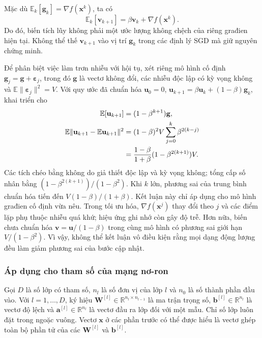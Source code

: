 Mặc dù $\mathbb{E}_k[\mathbf{g}_k]=\nabla f(\mathbf{x}^{k})$, ta có
\begin{equation}
 \mathbb{E}_k[\mathbf{v}_{k+1}]=\beta\mathbf{v}_k+
                                  \nabla f(\mathbf{x}^{k}).
 \label{eq:mom-conditional-mean}
\end{equation}
Do đó, biến tích lũy không phải một ước lượng không chệch của riêng
građien hiện tại. Không thể thế $\mathbf{v}_{k+1}$ vào vị trí
$\mathbf{g}_k$ trong các định lý SGD mà giữ nguyên chứng minh.

Để phân biệt việc làm trơn nhiễu với hội tụ, xét riêng mô hình cố định
$\mathbf{g}_j=\mathbf{g}+\boldsymbol{\varepsilon}_j$, trong đó
$\mathbf{g}$ là vectơ không đổi, các nhiễu độc lập có kỳ vọng không và
$\mathbb{E}\|\boldsymbol{\varepsilon}_j\|^2=V$.
Với quy ước đã chuẩn hóa $\mathbf{u}_0=0$,
$\mathbf{u}_{k+1}=\beta\mathbf{u}_k+(1-\beta)\mathbf{g}_k$, khai triển cho
\begin{align}
 \mathbb{E}[\mathbf{u}_{k+1}]&=(1-\beta^{k+1})\mathbf{g},\notag\\
 \mathbb{E}\|\mathbf{u}_{k+1}-\mathbb{E}\mathbf{u}_{k+1}\|^2
 &=(1-\beta)^2V\sum_{j=0}^{k}\beta^{2(k-j)}\notag\\
 &=\frac{1-\beta}{1+\beta}
             (1-\beta^{2(k+1)})V.
 \label{eq:mom-noise-smoothing}
\end{align}
Các tích chéo bằng không do giả thiết độc lập và kỳ vọng không; tổng
cấp số nhân bằng $(1-\beta^{2(k+1)})/(1-\beta^2)$.
Khi $k$ lớn, phương sai của trung bình chuẩn hóa tiến đến
$V(1-\beta)/(1+\beta)$.
Kết luận này chỉ áp dụng cho mô hình građien cố định vừa nêu.
Trong tối ưu hóa, $\nabla f(\mathbf{x}^{j})$ thay đổi theo $j$ và các
điểm lặp phụ thuộc nhiễu quá khứ; hiệu ứng ghi nhớ còn gây độ trễ.
Hơn nữa, biến chưa chuẩn hóa $\mathbf{v}=\mathbf{u}/(1-\beta)$ trong
cùng mô hình có phương sai giới hạn $V/(1-\beta^2)$.
Vì vậy, không thể kết luận vô điều kiện rằng mọi dạng động lượng đều
làm giảm phương sai của bước cập nhật.

\subsubsection{Áp dụng cho tham số của mạng nơ-ron}

Gọi $D$ là số lớp có tham số, $n_l$ là số đơn vị của lớp $l$
 và $n_0$ là số thành phần đầu vào.
Với $l=1,\ldots,D$, ký hiệu
$\mathbf{W}^{[l]}\in\mathbb{R}^{n_l\times n_{l-1}}$ là ma trận trọng số,
$\mathbf{b}^{[l]}\in\mathbb{R}^{n_l}$ là vectơ độ lệch và
$\mathbf{a}^{[l]}\in\mathbb{R}^{n_l}$ là vectơ đầu ra lớp đối với một mẫu.
Chỉ số lớp luôn đặt trong ngoặc vuông. Vectơ $\mathbf{x}$ ở các phần
trước có thể được hiểu là vectơ ghép toàn bộ phần tử của các
$\mathbf{W}^{[l]}$ và $\mathbf{b}^{[l]}$.

